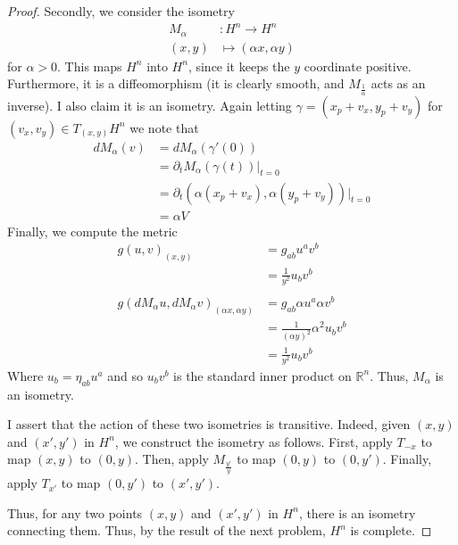 \documentclass[fontsize=11pt]{scrartcl} %
\numberwithin{equation}{section} %
\numberwithin{figure}{section} %
\numberwithin{table}{section} %
\newcommand{\R}{\mathbb{R}}
\begin{document}
\begin{proof}
    Secondly, we consider the isometry
    \[
        \begin{aligned}
        M_{\alpha}&:H^n\to H^n\\
        (x,y)&\mapsto (\alpha x, \alpha y)
    \end{aligned}
    \]
    for $\alpha>0$. This maps $H^n$ into $H^n$, since it keeps the $y$
    coordinate positive. Furthermore, it is a diffeomorphism (it is clearly
    smooth, and $M_{\frac{1}{\alpha}}$ acts as an inverse). I also claim it is
    an isometry. Again letting $\gamma = (x_p + v_x,y_p+v_y)$ for $(v_x,v_y)\in
    T_{(x,y)}H^n$ we note that
    \[
        \begin{aligned}
            dM_{\alpha}(v) &= dM_{\alpha}(\gamma'(0))\\
            &= \partial_t M_{\alpha}(\gamma(t))|_{t=0}\\
            &= \partial_t (\alpha(x_p + v_x),\alpha(y_p+v_y))|_{t=0}\\
            &= \alpha V
        \end{aligned}
    \]
    Finally, we compute the metric
    \[
\begin{aligned}
    g(u,v)_(x,y) &= g_{ab}u^av^b\\
    &=\frac{1}{y^2}u_bv^b\\
    \\
    g(dM_{\alpha}u,dM_{\alpha}v)_{(\alpha x,\alpha y)} &= g_{ab}\alpha u^a\alpha
    v^b\\
    &= \frac{1}{(\alpha y)^2}\alpha^2 u_bv^b\\
    &= \frac{1}{y^2}u_bv^b
\end{aligned}
    \]
    Where $u_b = \eta_{ab}u^a$ and so $u_bv^b$ is the standard inner product on
    $\R^n$. Thus, $M_{\alpha}$ is an isometry.

    I assert that the action of these two isometries is transitive. Indeed,
    given $(x,y)$ and $(x',y')$ in $H^n$, we construct the isometry as follows.
    First, apply $T_{-x}$ to map $(x,y)$ to $(0,y)$. Then, apply
    $M_{\frac{y'}{y}}$ to map $(0,y)$ to $(0,y')$. Finally, apply
    $T_{x'}$ to map $(0,y')$ to $(x',y')$.

    Thus, for any two points $(x,y)$ and $(x',y')$ in $H^n$, there is an
    isometry connecting them. Thus, by the result of the next problem, $H^n$ is
    complete.
\end{proof}

\newpage
\end{document}
